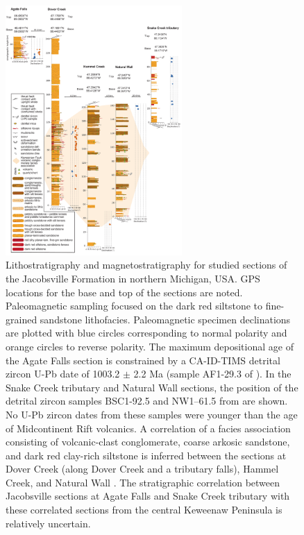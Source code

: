 \begin{figure}[h!]
\centering
\includegraphics[width=0.6\textwidth]{figure/Zhang2024a/Jacobsville_Sections_v6.pdf}
\caption{\footnotesize Lithostratigraphy and magnetostratigraphy for studied sections of the Jacobsville Formation in northern Michigan, USA. GPS locations for the base and top of the sections are noted. Paleomagnetic sampling focused on the dark red siltstone to fine-grained sandstone lithofacies. Paleomagnetic specimen declinations are plotted with blue circles corresponding to normal polarity and orange circles to reverse polarity. The maximum depositional age of the Agate Falls section is constrained by a CA-ID-TIMS detrital zircon U-Pb date of 1003.2 $\pm$ 2.2 Ma (sample AF1-29.3 of \cite{Hodgin2022a}). In the Snake Creek tributary and Natural Wall sections, the position of the detrital zircon samples BSC1-92.5 and NW1–61.5 from \cite{Hodgin2022a} are shown. No U-Pb zircon dates from these samples were younger than the age of Midcontinent Rift volcanics. A correlation of a facies association consisting of volcanic-clast conglomerate, coarse arkosic sandstone, and dark red clay-rich siltstone is inferred between the sections at Dover Creek (along Dover Creek and a tributary falls), Hammel Creek, and Natural Wall \citep{Brojanigo1984a}. The stratigraphic correlation between Jacobsville sections at Agate Falls and Snake Creek tributary with these correlated sections from the central Keweenaw Peninsula is relatively uncertain.}
\label{fig:strat_column}
\end{figure}

